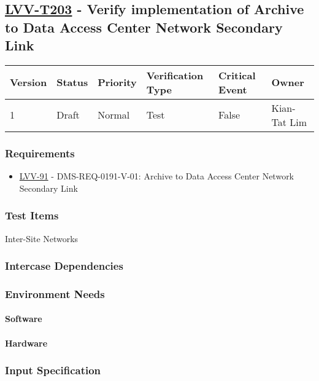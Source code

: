 \subsection{\href{https://jira.lsstcorp.org/secure/Tests.jspa\#/testCase/LVV-T203}{LVV-T203}
    - Verify implementation of Archive to Data Access Center Network Secondary Link}\label{lvv-t203}

\begin{longtable}[]{llllll}
\toprule
Version & Status & Priority & Verification Type & Critical Event & Owner
\\\midrule
1 & Draft & Normal &
Test & False & Kian-Tat Lim
\\\bottomrule
\end{longtable}

\subsubsection{Requirements}
\begin{itemize}
\item \href{https://jira.lsstcorp.org/browse/LVV-91}{LVV-91} - DMS-REQ-0191-V-01: Archive to Data Access Center Network Secondary Link
\end{itemize}

\subsubsection{Test Items}
Inter-Site Networks~



\subsubsection{Intercase Dependencies}

\subsubsection{Environment Needs}

\paragraph{Software}

\paragraph{Hardware}

\subsubsection{Input Specification}

